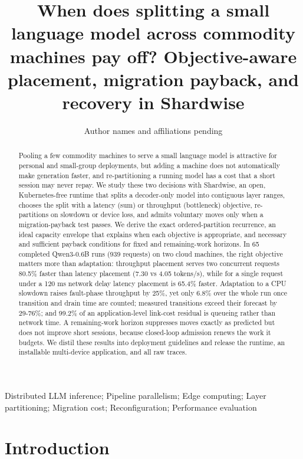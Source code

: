 \documentclass[preprint,12pt]{elsarticle}
\begin{document}
\begin{frontmatter}
\title{When does splitting a small language model across commodity
machines pay off? Objective-aware placement, migration payback, and
recovery in Shardwise}
\author{Author names and affiliations pending}
\begin{abstract}
Pooling a few commodity machines to serve a small language model is
attractive for personal and small-group deployments, but adding a
machine does not automatically make generation faster, and
re-partitioning a running model has a cost that a short session may
never repay. We study these two decisions with Shardwise, an open,
Kubernetes-free runtime that splits a decoder-only model into contiguous
layer ranges, chooses the split with a latency (sum) or throughput
(bottleneck) objective, re-partitions on slowdown or device loss, and
admits voluntary moves only when a migration-payback test passes. We
derive the exact ordered-partition recurrence, an ideal capacity
envelope that explains when each objective is appropriate, and necessary
and sufficient payback conditions for fixed and remaining-work horizons.
In 65 completed Qwen3-0.6B runs (939 requests) on two cloud machines,
the right objective matters more than adaptation: throughput placement
serves two concurrent requests 80.5\% faster than latency placement
(7.30 vs 4.05 tokens/s), while for a single request under a 120 ms
network delay latency placement is 65.4\% faster. Adaptation to a CPU
slowdown raises fault-phase throughput by 25\%, yet only 6.8\% over the
whole run once transition and drain time are counted; measured
transitions exceed their forecast by 29-76\%; and 99.2\% of an
application-level link-cost residual is queueing rather than network
time. A remaining-work horizon suppresses moves exactly as predicted but
does not improve short sessions, because closed-loop admission renews
the work it budgets. We distil these results into deployment guidelines
and release the runtime, an installable multi-device application, and
all raw traces.
\end{abstract}
\begin{keyword}
Distributed LLM inference; Pipeline parallelism; Edge computing; Layer
partitioning; Migration cost; Reconfiguration; Performance evaluation
\end{keyword}
\end{frontmatter}
\hypertarget{introduction}{%
\section{Introduction}\label{introduction}}
\end{document}
